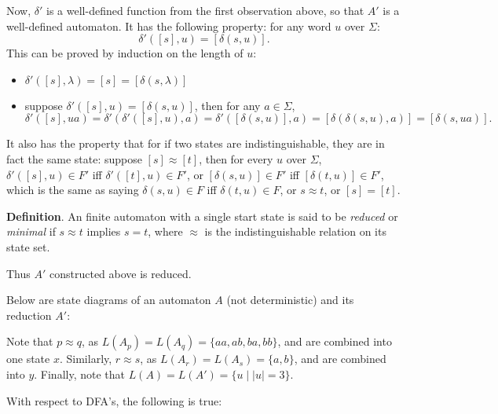 \documentclass[12pt]{article}
\begin{document}
Now, $\delta'$ is a well-defined function from the first observation above, so that $A'$ is a well-defined automaton.  It has the following property: for any word $u$ over $\Sigma$:
$$\delta'([s],u)=[\delta(s,u)].$$
This can be proved by induction on the length of $u$:
\begin{itemize}
\item $\delta'([s],\lambda)=[s]=[\delta(s,\lambda)]$
\item suppose $\delta'([s],u)=[\delta(s,u)]$, then for any $a\in \Sigma$, $$\delta'([s],ua)=\delta'(\delta'([s],u),a) = \delta'([\delta(s,u)],a)= [\delta(\delta(s,u),a)] = [\delta(s,ua)].$$
\end{itemize}

It also has the property that for if two states are indistinguishable, they are in fact the same state: suppose $[s]\approx [t]$, then for every $u$ over $\Sigma$, $\delta'([s],u)\in F'$ iff $\delta'([t],u)\in F'$, or $[\delta(s,u)]\in F'$ iff $[\delta(t,u)]\in F'$, which is the same as saying $\delta(s,u)\in F$ iff $\delta(t,u)\in F$, or $s \approx t$, or $[s]=[t]$.

\textbf{Definition}.  An finite automaton with a single start state is said to be \emph{reduced} or \emph{minimal} if $s\approx t$ implies $s=t$, where $\approx$ is the indistinguishable relation on its state set.

Thus $A'$ constructed above is reduced.

Below are state diagrams of an automaton $A$ (not deterministic) and its reduction $A'$:

\begin{figure}[!h]
\centering
{}
\end{figure}

Note that $p\approx q$, as $L(A_p)=L(A_q)=\lbrace aa, ab, ba, bb\rbrace$, and are combined into one state $x$.  Similarly, $r\approx s$, as $L(A_r)=L(A_s)=\lbrace a,b\rbrace$, and are combined into $y$.  Finally, note that $L(A)=L(A')=\lbrace u\mid |u|=3\rbrace$.

With respect to DFA's, the following is true:
\end{document}
